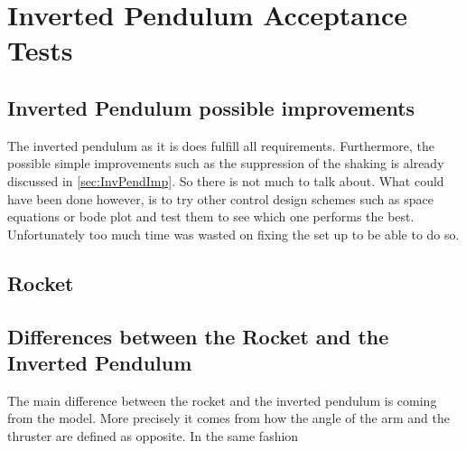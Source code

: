 \chapter{Inverted Pendulum Acceptance Tests}\label{sec:Discussion}

\section{Inverted Pendulum possible improvements}

The inverted pendulum as it is does fulfill all requirements. Furthermore, the possible simple improvements such as the suppression of the shaking is already discussed in \autoref{sec:InvPendImp}. So there is not much to talk about. What could have been done however, is to try other control design schemes such as space equations or bode plot and test them to see which one performs the best. Unfortunately too much time was wasted on fixing the set up to be able to do so.

\section{Rocket}



\section{Differences between the Rocket and the Inverted Pendulum}

The main difference between the rocket and the inverted pendulum is coming from the model. More precisely it comes from how the angle of the arm and the thruster are defined as opposite. In the same fashion